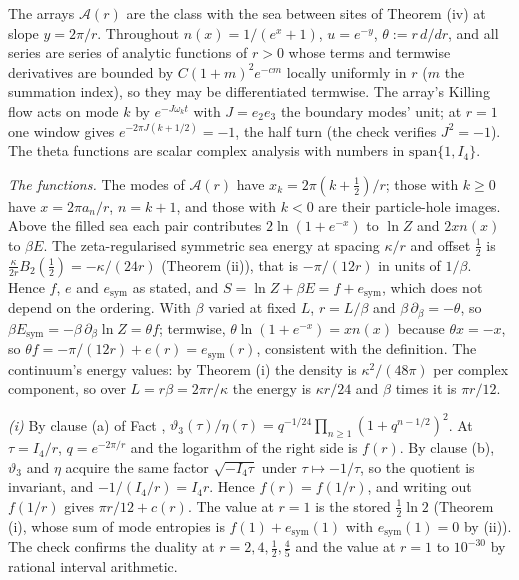 The arrays $\mathcal{A}(r)$ are the class with the sea between sites of Theorem (iv) at slope $y = 2\pi/r$. Throughout $n(x) = 1/(e^{x} + 1)$, $u = e^{-y}$, $\theta := r\,d/dr$, and all series are series of analytic functions of $r > 0$ whose terms and termwise derivatives are bounded by $C(1 + m)^{2}e^{-cm}$ locally uniformly in $r$ ($m$ the summation index), so they may be differentiated termwise. The array's Killing flow acts on mode $k$ by $e^{-J\omega_{k}t}$ with $J = e_{2}e_{3}$ the boundary modes' unit; at $r = 1$ one window gives $e^{-2\pi J(k + 1/2)} = -1$, the half turn (the check verifies $J^{2} = -1$). The theta functions are scalar complex analysis with numbers in $\mathrm{span}\{1, I_4\}$.

\emph{The functions.} The modes of $\mathcal{A}(r)$ have $x_{k} = 2\pi(k + \tfrac12)/r$; those with $k \ge 0$ have $x = 2\pi a_{n}/r$, $n = k + 1$, and those with $k < 0$ are their particle-hole images. Above the filled sea each pair contributes $2\ln(1 + e^{-x})$ to $\ln Z$ and $2xn(x)$ to $\beta E$. The zeta-regularised symmetric sea energy at spacing $\kappa/r$ and offset $\tfrac12$ is $\tfrac{\kappa}{2r}B_{2}(\tfrac12) = -\kappa/(24r)$ (Theorem (ii)), that is $-\pi/(12r)$ in units of $1/\beta$. Hence $f$, $e$ and $e_{\mathrm{sym}}$ as stated, and $S = \ln Z + \beta E = f + e_{\mathrm{sym}}$, which does not depend on the ordering. With $\beta$ varied at fixed $L$, $r = L/\beta$ and $\beta\,\partial_{\beta} = -\theta$, so $\beta E_{\mathrm{sym}} = -\beta\,\partial_{\beta}\ln Z = \theta f$; termwise, $\theta\ln(1 + e^{-x}) = xn(x)$ because $\theta x = -x$, so $\theta f = -\pi/(12r) + e(r) = e_{\mathrm{sym}}(r)$, consistent with the definition. The continuum's energy values: by Theorem (i) the density is $\kappa^{2}/(48\pi)$ per complex component, so over $L = r\beta = 2\pi r/\kappa$ the energy is $\kappa r/24$ and $\beta$ times it is $\pi r/12$.

\emph{(i)} By clause (a) of Fact , $\vartheta_{3}(\tau)/\eta(\tau) = q^{-1/24}\prod_{n \ge 1}(1 + q^{n - 1/2})^{2}$. At $\tau = I_4/r$, $q = e^{-2\pi/r}$ and the logarithm of the right side is $f(r)$. By clause (b), $\vartheta_{3}$ and $\eta$ acquire the same factor $\sqrt{-I_4\tau}$ under $\tau \mapsto -1/\tau$, so the quotient is invariant, and $-1/(I_4/r) = I_4r$. Hence $f(r) = f(1/r)$, and writing out $f(1/r)$ gives $\pi r/12 + c(r)$. The value at $r = 1$ is the stored $\tfrac12\ln 2$ (Theorem (i), whose sum of mode entropies is $f(1) + e_{\mathrm{sym}}(1)$ with $e_{\mathrm{sym}}(1) = 0$ by (ii)). The check confirms the duality at $r = 2, 4, \tfrac12, \tfrac45$ and the value at $r = 1$ to $10^{-30}$ by rational interval arithmetic.


